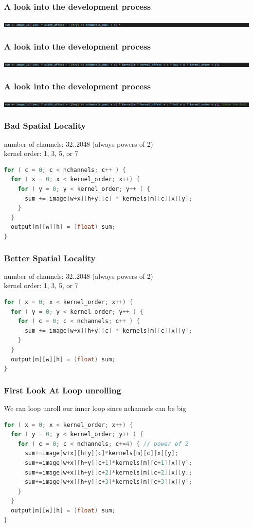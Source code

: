 \documentclass{beamer}
\begin{document}
\begin{frame}[fragile]
\frametitle{A look into the development process}
\includegraphics[width=1\textwidth]{images/dereference_j_2}
\end{frame}
  
\begin{frame}[fragile]
\frametitle{A look into the development process}
\includegraphics[width=1\textwidth]{images/dereference_j_3}
\end{frame}
  
\begin{frame}[fragile]
\frametitle{A look into the development process}
\includegraphics[width=1\textwidth]{images/dereference_j_4}
\end{frame}

\begin{frame}[fragile]
\frametitle{Bad Spatial Locality}
number of channels: 32..2048 (always powers of 2) \\
kernel order: 1, 3, 5, or 7
\begin{lstlisting}[language=C,keywordstyle=\color{blue}]
for ( c = 0; c < nchannels; c++ ) {
  for ( x = 0; x < kernel_order; x++) {
    for ( y = 0; y < kernel_order; y++ ) {
      sum += image[w+x][h+y][c] * kernels[m][c][x][y];
    }
  }
  output[m][w][h] = (float) sum;
}
\end{lstlisting}
\end{frame}

\begin{frame}[fragile]
\frametitle{Better Spatial Locality}
number of channels: 32..2048 (always powers of 2) \\
kernel order: 1, 3, 5, or 7
\begin{lstlisting}[language=C,keywordstyle=\color{blue}]
for ( x = 0; x < kernel_order; x++) {
  for ( y = 0; y < kernel_order; y++ ) {
    for ( c = 0; c < nchannels; c++ ) {
      sum += image[w+x][h+y][c] * kernels[m][c][x][y];
    }
  }
  output[m][w][h] = (float) sum;
}
\end{lstlisting}
\end{frame}

\begin{frame}[fragile]
\frametitle{First Look At Loop unrolling}
We can loop unroll our inner loop since nchannels can be big
\begin{lstlisting}[language=C,keywordstyle=\color{blue}]
for ( x = 0; x < kernel_order; x++) {
  for ( y = 0; y < kernel_order; y++ ) {
    for ( c = 0; c < nchannels; c+=4) { // power of 2 
      sum+=image[w+x][h+y][c]*kernels[m][c][x][y];
      sum+=image[w+x][h+y][c+1]*kernels[m][c+1][x][y];
      sum+=image[w+x][h+y][c+2]*kernels[m][c+2][x][y];
      sum+=image[w+x][h+y][c+3]*kernels[m][c+3][x][y];
    }
  }
  output[m][w][h] = (float) sum;
}
\end{lstlisting}
\end{frame}
\end{document}
